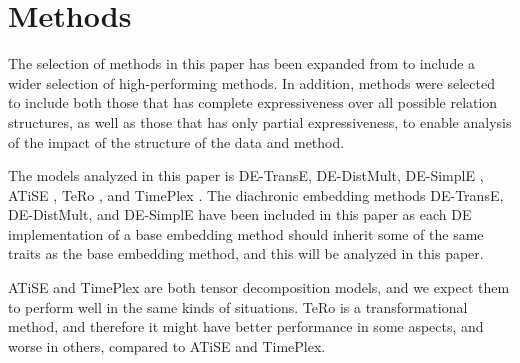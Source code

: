\section{Methods}
\label{sec:methods}

The selection of methods in this paper has been expanded from \cite{P9} to include a wider selection of high-performing methods. In addition, methods were selected to include both those that has complete expressiveness over all possible relation structures, as well as those that has only partial expressiveness, to enable analysis of the impact of the structure of the data and method. 

The models analyzed in this paper is DE-TransE, DE-DistMult, DE-SimplE \cite{goel19diachronicemb}, ATiSE \cite{xu19atise}, TeRo \cite{xu2020tero}, and TimePlex \cite{jain2020timeplex}. The diachronic embedding methods DE-TransE, DE-DistMult, and DE-SimplE have been included in this paper as each DE implementation of a base embedding method should inherit some of the same traits as the base embedding method, and this will be analyzed in this paper.

ATiSE and TimePlex are both tensor decomposition models, and we expect them to perform well in the same kinds of situations. TeRo is a transformational method, and therefore it might have better performance in some aspects, and worse in others, compared to ATiSE and TimePlex.

